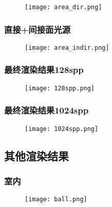 \documentclass[14pt]{scrartcl} %
\begin{document}
\begin{figure}[h] %
	\centering
	\texttt{[image: area\_dir.png]} %
\end{figure}

\subsubsection{直接+间接面光源}

\begin{figure}[h] %
	\centering
	\texttt{[image: area\_indir.png]} %
\end{figure}

\pagebreak

\subsubsection{最终渲染结果128spp}

\begin{figure}[h] %
	\centering
	\texttt{[image: 128spp.png]} %
\end{figure}

\subsubsection{最终渲染结果1024spp}

\begin{figure}[h] %
	\centering
	\texttt{[image: 1024spp.png]} %
\end{figure}

\pagebreak

\subsection{其他渲染结果}

\subsubsection{室内}

\begin{figure}[h] %
	\centering
	\texttt{[image: ball.png]} %
\end{figure}
\end{document}
